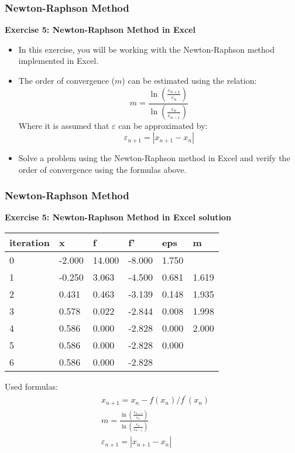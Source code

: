 \begin{frame}[fragile]
    \frametitle{Newton-Raphson Method}
    
    \textbf{Exercise 5: Newton-Raphson Method in Excel}

    \begin{itemize}
        \item In this exercise, you will be working with the Newton-Raphson method implemented in Excel.
        \item The order of convergence (\(m\)) can be estimated using the relation:
        \[m = \frac{\ln\left(\frac{\varepsilon_{n+1}}{\varepsilon_{n}}\right)}{\ln\left(\frac{\varepsilon_{n}}{\varepsilon_{n-1}}\right)}\]
        Where it is assumed that $\varepsilon$ can be approximated by: 
        \[\varepsilon_{n+1} = |x_{n+1} - x_{n}|\]
        \item Solve a problem using the Newton-Raphson method in Excel and verify the order of convergence using the formulas above.
    \end{itemize}
\end{frame}

\begin{frame}[fragile]
  \frametitle{Newton-Raphson Method}
  
  \textbf{Exercise 5: Newton-Raphson Method in Excel solution}

  \begin{table}[]
    \begin{tabular}{|l|l|l|l|l|l|}
    \hline
    iteration & x      & f      & f'     & eps   & m     \\ \hline
    0         & -2.000 & 14.000 & -8.000 & 1.750 &       \\ \hline
    1         & -0.250 & 3.063  & -4.500 & 0.681 & 1.619 \\ \hline
    2         & 0.431  & 0.463  & -3.139 & 0.148 & 1.935 \\ \hline
    3         & 0.578  & 0.022  & -2.844 & 0.008 & 1.998 \\ \hline
    4         & 0.586  & 0.000  & -2.828 & 0.000 & 2.000 \\ \hline
    5         & 0.586  & 0.000  & -2.828 & 0.000 &       \\ \hline
    6         & 0.586  & 0.000  & -2.828 &       &       \\ \hline
    \end{tabular}
    \end{table}

    Used formulas:
    \begin{align*}
        &x_{n+1} = x_n - f(x_n)/f^\prime(x_n)  \\
        &m = \frac{\ln\left(\frac{\varepsilon_{n+1}}{\varepsilon_{n}}\right)}{\ln\left(\frac{\varepsilon_{n}}{\varepsilon_{n-1}}\right)}\\
        &\varepsilon_{n+1} = |x_{n+1} - x_{n}|
    \end{align*}
\end{frame}

